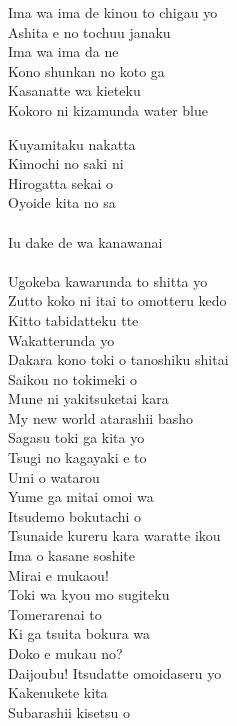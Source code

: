 \def\songtitle{WATER BLUE NEW WORLD}
\def\songcomment{Season 2 Insert Song}
\def\songlyrics{Aki Hata}
\def\songwriter{Takashi Saeki}
\def\songarrange{Takashi Saeki}
   
\ifdefined\COMPLETE
\else
	
	
\fi
\thispagestyle{song}
\vspace*{-2.5em}
\begin{multicols}{2}\small
Ima wa ima de kinou to chigau yo\\
Ashita e no tochuu janaku\\
Ima wa ima da ne\\
Kono shunkan no koto ga\\
Kasanatte wa kieteku\\
Kokoro ni kizamunda water blue\\


Kuyamitaku nakatta\\
Kimochi no saki ni\\
Hirogatta sekai o\\
Oyoide kita no sa\\
\\
Iu dake de wa kanawanai\\
\\
Ugokeba kawarunda to shitta yo\\

Zutto koko ni itai to omotteru kedo\\
Kitto tabidatteku tte\\
Wakatterunda yo\\
Dakara kono toki o tanoshiku shitai\\
Saikou no tokimeki o\\
Mune ni yakitsuketai kara\\

My new world atarashii basho\\
Sagasu toki ga kita yo\\
Tsugi no kagayaki e to\\
Umi o watarou\\
Yume ga mitai omoi wa\\
Itsudemo bokutachi o\\
Tsunaide kureru kara waratte ikou\\
Ima o kasane soshite\\
Mirai e mukaou!\\

Toki wa kyou mo sugiteku\\
Tomerarenai to\\
Ki ga tsuita bokura wa\\
Doko e mukau no?\\
Daijoubu! Itsudatte omoidaseru yo\\
Kakenukete kita\\
Subarashii kisetsu o\columnbreak


\end{multicols}
